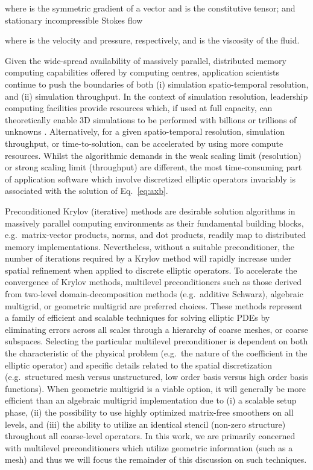 \documentclass[]{siamart0216}
\begin{document}
where  
is the symmetric gradient of a vector and  is the constitutive tensor; 
and stationary incompressible Stokes flow

where  is the velocity and pressure, respectively, and  is the viscosity of the fluid.

Given the wide-spread availability of massively parallel, distributed memory computing capabilities 
offered by computing centres, application scientists continue to push the boundaries of 
both (i) simulation spatio-temporal resolution, and (ii) simulation throughput.
In the context of simulation resolution, leadership computing facilities provide resources which, if used at full capacity, 
can theoretically enable 3D simulations to be performed with billions or trillions of unknowns  \cite{gmeiner2014parallel}. 
Alternatively, for a given spatio-temporal resolution, simulation throughput, or time-to-solution, 
can be accelerated by using more compute resources.
Whilst the algorithmic demands in the weak scaling limit (resolution) or strong scaling limit (throughput) are different, 
the most time-consuming part of application software which involve discretized elliptic operators invariably is associated 
with the solution of Eq.~\eqref{eq:axb}.

Preconditioned Krylov (iterative) methods are desirable solution algorithms in massively parallel computing environments as their 
fundamental building blocks, e.g.~matrix-vector products, norms, and dot products, readily map to distributed memory 
implementations. Nevertheless, without a suitable preconditioner, the number of iterations required by a Krylov method 
will rapidly increase under spatial refinement when applied to discrete elliptic operators.
To accelerate the convergence of Krylov methods, multilevel preconditioners such as those derived from two-level 
domain-decomposition methods (e.g.~additive Schwarz), algebraic multigrid, or geometric multigrid are preferred choices. 
These methods represent a family of efficient and scalable techniques for solving elliptic PDEs by eliminating errors 
across all  scales through a hierarchy of coarse meshes, or coarse subspaces. 
Selecting the particular multilevel preconditioner is dependent on both the characteristic of the physical problem 
(e.g.~the nature of the coefficient in the elliptic operator) and specific details related to the spatial discretization 
(e.g.~structured mesh versus unstructured, low order basis versus high order basis functions).
When geometric multigrid is a viable option, it will generally be more efficient than an algebraic 
multigrid implementation due to 
(i)  a scalable setup phase, 
(ii) the possibility to use highly optimized matrix-free smoothers on all levels, 
and (iii) the ability to utilize an identical stencil (non-zero structure) throughout all coarse-level operators. 
In this work, we are primarily concerned with multilevel preconditioners which utilize geometric 
information (such as a mesh) and thus we will focus the remainder of this discussion on such techniques. 
\end{document}
